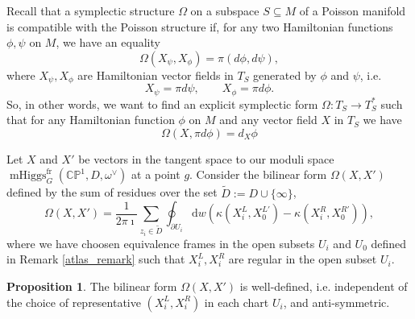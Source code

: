 \documentclass[11pt, oneside, reqno]{amsart}
\theoremstyle{definition} \newtheorem{definition}{Definition}[section]
\newtheorem{prop}[definition]{Proposition}
\theoremstyle{definition} \newtheorem{remark}[definition]{Remark}
\theoremstyle{definition} \newtheorem{remarks}[definition]{Remarks}
\theoremstyle{definition} \newtheorem{question}[definition]{Question}
\theoremstyle{definition} \newtheorem*{note}{Note}
\theoremstyle{definition} \newtheorem{example}[definition]{Example}
\theoremstyle{definition} \newtheorem{examples}[definition]{Examples}
\newcommand{\bb}[1]{\mathbb{#1}}
\newcommand{\sub}{\subseteq}
\DeclareMathOperator{\mhiggs}{mHiggs}
\renewcommand{\d}{\mathrm{d}}
\newcommand{\fr}{\mathrm{fr}}
\begin{document}
 Recall that a symplectic structure $\Omega$ on a subspace $S \sub M$ of a Poisson manifold is compatible with the Poisson structure if, for any two Hamiltonian functions $\phi, \psi$ on $M$, we have an equality
 \begin{equation}
\label{eq:compatibility}
   \Omega(X_{\psi}, X_{\phi}) = \pi (d\phi, d \psi),
 \end{equation}
 where $X_{\psi}, X_{\phi}$ are Hamiltonian vector fields in $T_{S}$ generated by $\phi$ and  $\psi$, i.e.
 \begin{equation}
   X_{\psi} = \pi d \psi, \qquad X_{\phi} = \pi d \phi.
 \end{equation}
So, in other words, we want to find an explicit symplectic form $\Omega: T_{S} \to T_{S}^{*} $ such that for any Hamiltonian function $\phi$ on $M$ and any vector field $X$ in $T_{S}$ we have
 \begin{equation}
   \Omega(X, \pi d \phi) = d_{X} \phi 
 \end{equation}

Let $X$ and $X'$ be vectors in the tangent space to our moduli space $\mhiggs^\fr_G(\bb{CP}^1, D, \omega^\vee)$ at a point $g$. Consider the bilinear form $\Omega(X, X')$ defined by the sum of residues over the set $\tilde D := D \cup \{\infty\}$,
 \begin{equation}
\label{eq:Omega}
   \Omega(X, X')  = \frac{1}{2 \pi \imath} \sum_{z_i \in \tilde D} \oint_{\partial U_i}  \d w (
\kappa(X^{L}_{i}, X^{L'}_{0})  - \kappa( X^{R}_{i},  X^{R'}_{0})),
\end{equation}
where we have choosen equivalence frames in the open subsets $U_i$ and $U_0$ defined in Remark \ref{atlas_remark} such that $X_i^{L}, X_i^{R}$ are regular in the open subset $U_i$.

\begin{prop}
The bilinear form $\Omega(X, X')$ is well-defined, i.e. independent of the choice of representative $(X^L_i, X^R_i)$ in each chart $U_i$, and anti-symmetric.
\end{prop}
\end{document}
